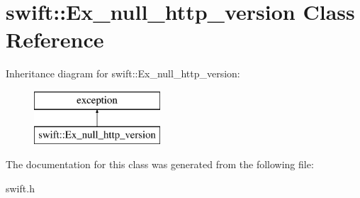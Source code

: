 \hypertarget{classswift_1_1_ex__null__http__version}{\section{swift\-:\-:Ex\-\_\-null\-\_\-http\-\_\-version Class Reference}
\label{classswift_1_1_ex__null__http__version}
}
Inheritance diagram for swift\-:\-:Ex\-\_\-null\-\_\-http\-\_\-version\-:\begin{figure}[H]
\begin{center}
\leavevmode
\includegraphics[height=2.000000cm]{classswift_1_1_ex__null__http__version}
\end{center}
\end{figure}


The documentation for this class was generated from the following file\-:\begin{DoxyCompactItemize}
\item 
swift.\-h\end{DoxyCompactItemize}
